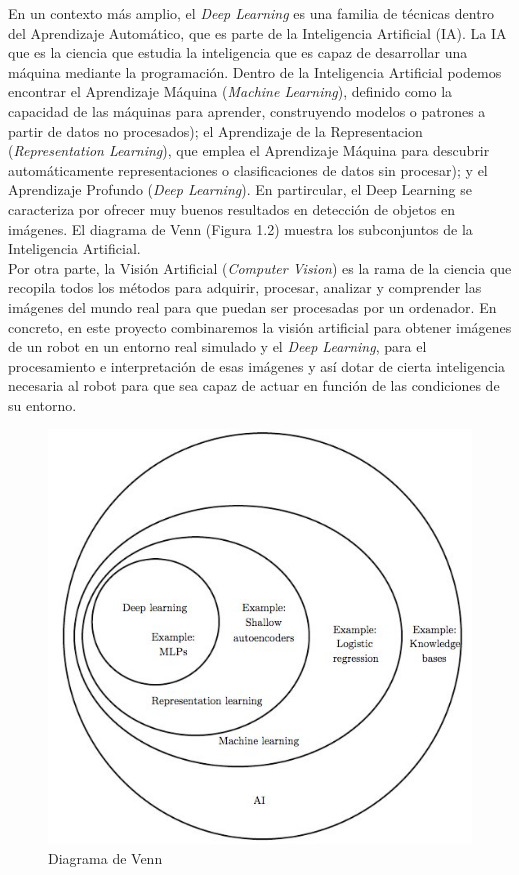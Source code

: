 \documentclass{report}
\begin{document}
En un contexto más amplio, el \textit{Deep Learning} es una familia de técnicas dentro del Aprendizaje Automático, que es parte de la Inteligencia Artificial (IA). La IA que es la ciencia que estudia la inteligencia que es capaz de desarrollar una máquina mediante la programación. Dentro de la Inteligencia Artificial podemos encontrar el Aprendizaje Máquina (\textit{Machine Learning}), definido como la capacidad de las máquinas para aprender, construyendo modelos o patrones a partir de datos no procesados); el Aprendizaje de la Representacion (\textit{Representation Learning}), que emplea el Aprendizaje Máquina para descubrir automáticamente representaciones o clasificaciones de datos sin procesar); y el Aprendizaje Profundo (\textit{Deep Learning}). En partircular, el Deep Learning se caracteriza por ofrecer muy buenos resultados en detección de objetos en imágenes. El diagrama de Venn (Figura 1.2) muestra los subconjuntos de la Inteligencia Artificial.
\\

Por otra parte, la Visión Artificial (\textit{Computer Vision}) es la rama de la ciencia que recopila todos los métodos para adquirir, procesar, analizar y comprender las imágenes del mundo real para que puedan ser procesadas por un ordenador. En concreto, en este proyecto combinaremos la visión artificial para obtener imágenes de un robot en un entorno real simulado y el \textit{Deep Learning}, para el procesamiento e interpretación de esas imágenes y así dotar de cierta inteligencia necesaria al robot para que sea capaz de actuar en función de las condiciones de su entorno. 

\renewcommand{\figurename}{Figura}		
\begin{figure}[h]
	\centering
	 \includegraphics[scale=0.5]{images/diagrama-venn.jpg}
	 \caption{Diagrama de Venn}
\end{figure}
\end{document}
